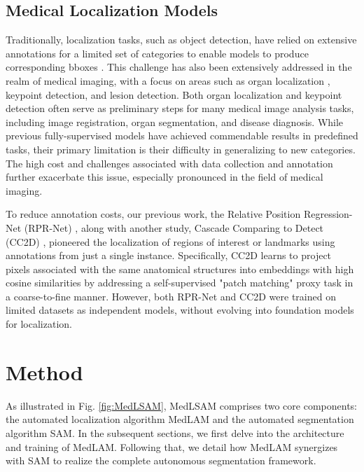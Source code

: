 \documentclass[times,twocolumn,final]{elsarticle}
\begin{document}
\subsection{Medical Localization Models}
Traditionally, localization tasks, such as object detection, have relied on extensive annotations for a limited set of categories to enable models to produce corresponding bboxes \citep{redmon2016you, he2017mask, dai2016r, ren2015faster}. This challenge has also been extensively addressed in the realm of medical imaging, with a focus on areas such as organ localization \citep{xu2019efficient,navarro2020deep, hussain2021cascaded, navarro2022unified}, keypoint detection\citep{chen2021fast, wan2023multi}, and lesion detection\citep{yan2018deeplesion, zhang2018automatic}. Both organ localization and keypoint detection often serve as preliminary steps for many medical image analysis tasks, including image registration\citep{sun2013validation}, organ segmentation\citep{liu2023clip}, and disease diagnosis\citep{bilic2023liver}. While previous fully-supervised models have achieved commendable results in predefined tasks, their primary limitation is their difficulty in generalizing to new categories. The high cost and challenges associated with data collection and annotation further exacerbate this issue, especially pronounced in the field of medical imaging.
\par To reduce annotation costs, our previous work, the Relative Position Regression-Net (RPR-Net) \citep{lei2021contrastive}, along with another study, Cascade Comparing to Detect (CC2D) \citep{yao2021one}, pioneered the localization of regions of interest or landmarks using annotations from just a single instance. Specifically, CC2D learns to project pixels associated with the same anatomical structures into embeddings with high cosine similarities by addressing a self-supervised "patch matching" proxy task in a coarse-to-fine manner. However, both RPR-Net and CC2D were trained on limited datasets as independent models, without evolving into foundation models for localization. 

\section{Method}

As illustrated in Fig. \ref{fig:MedLSAM}, MedLSAM comprises two core components: the automated localization algorithm MedLAM and the automated segmentation algorithm SAM. In the subsequent sections, we first delve into the architecture and training of MedLAM. Following that, we detail how MedLAM synergizes with SAM to realize the complete autonomous segmentation framework.
\end{document}
